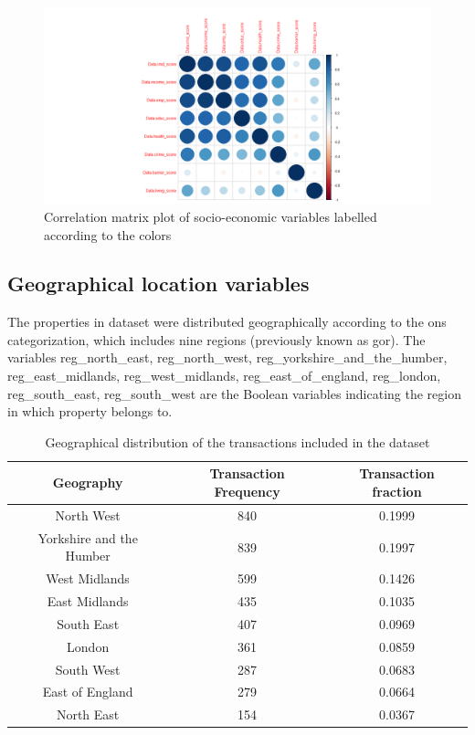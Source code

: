 \documentclass[12pt]{article}
\begin{document}
\begin{figure}[H]
    \centering
    \includegraphics[width=18cm]{corrmat.png}
    \caption{Correlation matrix plot of socio-economic variables labelled according to the colors}
    \label{fig:corrmat}
\end{figure}

\subsection{Geographical location variables}
 The properties in dataset were distributed geographically according to the \acrfull{ons} categorization, which includes nine regions (previously known as \acrshort{gor}). The variables reg\_north\_east, reg\_north\_west, reg\_yorkshire\_and\_the\_humber, reg\_east\_midlands, reg\_west\_midlands, reg\_east\_of\_england, reg\_london, reg\_south\_east, reg\_south\_west are the Boolean variables indicating the region in which property belongs to.

  \begin{table}[H]
\centering
\begin{tabular}{c c c} 
 \hline
 Geography & Transaction Frequency & Transaction fraction \\ [0.5ex] 
 \hline
 North West & 840 & 0.1999 \\
 Yorkshire and the Humber & 839 & 0.1997 \\
 West Midlands & 599 & 0.1426 \\
 East Midlands & 435 & 0.1035 \\
 South East & 407 & 0.0969 \\
 London & 361 & 0.0859 \\
 South West & 287 & 0.0683 \\
 East of England & 279 & 0.0664 \\
 North East & 154 & 0.0367 \\ [1ex] 
 \hline
\end{tabular}
\caption{Geographical distribution of the transactions included in the dataset}
\label{table:geo}
\end{table}
 
\end{document}
